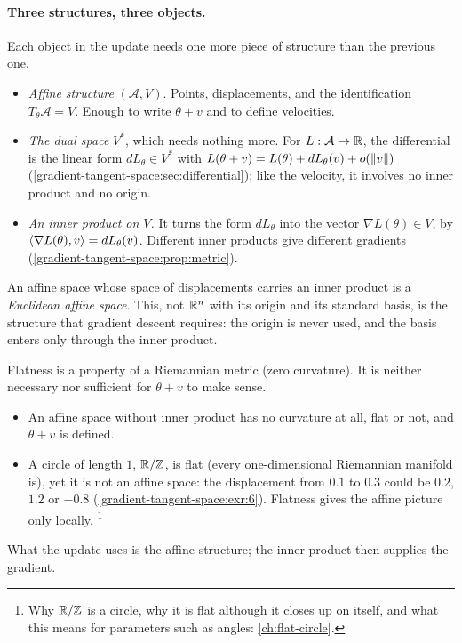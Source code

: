 \begin{notechapter}
\paragraph{Three structures, three objects.} Each object in the update needs one more piece of
structure than the previous one.
\begin{itemize}[nosep]
  \item \emph{Affine structure} $(\mathcal A, V)$. Points, displacements, and the identification
        $T_\theta\mathcal A = V$. Enough to write $\theta + v$ and to define velocities.
  \item \emph{The dual space} $V^*$, which needs nothing more. For $L:\mathcal A\to\mathbb{R}$, the differential is the linear
        form $dL_\theta\in V^*$ with $L(\theta + v) = L(\theta) + dL_\theta(v) + o(\left\|v\right\|)$
        (\cref{gradient-tangent-space:sec:differential}); like the velocity, it involves no inner
        product and no origin.
  \item \emph{An inner product on $V$.} It turns the form $dL_\theta$ into the vector $\nabla L(\theta)\in V$, by
        $\left\langle \nabla L(\theta), v \right\rangle = dL_\theta(v)$. Different inner products give different gradients
        (\cref{gradient-tangent-space:prop:metric}).
\end{itemize}
An affine space whose space of displacements carries an inner product is a \emph{Euclidean affine
space}. This, not $\mathbb{R}^n$ with its origin and its standard basis, is the structure that gradient
descent requires: the origin is never used, and the basis enters only through the inner
product.

\begin{pitfall}
Flatness is a property of a Riemannian metric (zero curvature). It is neither necessary nor
sufficient for $\theta + v$ to make sense.
\begin{itemize}[nosep]
  \item An affine space without inner product has no curvature at all, flat or not, and $\theta + v$
        is defined.
  \item A circle of length $1$, $\mathbb{R}/\mathbb{Z}$, is flat (every one-dimensional Riemannian manifold is), yet
        it is not an affine space: the displacement from $0.1$ to $0.3$ could be $0.2$, $1.2$ or $-0.8$
        (\cref{gradient-tangent-space:exr:6}). Flatness gives the affine picture only locally.%
        \footnote{Why $\mathbb{R}/\mathbb{Z}$ is a circle, why it is flat although it closes up on itself, and what
        this means for parameters such as angles: \cref{ch:flat-circle}.}
\end{itemize}
What the update uses is the affine structure; the inner product then supplies the gradient.
\end{pitfall}


\end{notechapter}
